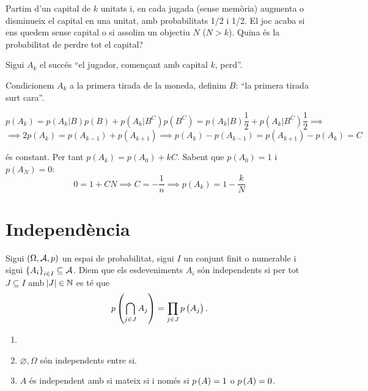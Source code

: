 \begin{problema}
    Partim d'un capital de $k$ unitats i, en cada jugada (sense memòria) augmenta o disminueix el capital en una unitat,
    amb probabilitats 1/2 i 1/2. El joc acaba si ens quedem sense capital o si assolim un objectiu $N$ ($N>k$).
    Quina és la probabilitat de perdre tot el capital?
\end{problema}
\begin{sol}
    
    Sigui $A_k$ el succés ``el jugador, començant amb capital $k$, perd''.
    
    Condicionem $A_k$ a la primera tirada de la moneda, definim $B$: ``la primera tirada surt cara''.
    
    \[p(A_k) = p(A_k|B)p(B) + p(A_k|B^C)p(B^C) = p(A_k|B)\frac{1}{2} + p(A_k|B^C)\frac{1}{2} \implies\]
    \[\implies 2p(A_k)=p(A_{k-1}) + p(A_{k+1}) \implies p(A_k) - p(A_{k-1}) = p(A_{k+1}) - p(A_k) = C\]
    
    és constant. Per tant $p(A_k) = p(A_0)+kC$. Sabent que $p(A_0)=1$ i $p(A_N)=0$:
    \[0 = 1 + CN \implies C = -\frac{1}{n} \implies p(A_k) = 1 - \frac{k}{N}\]
\end{sol}

\section{Independència}
\begin{defi}
    Sigui $\left( \Omega, \mathcal{A}, p\right)$ un espai de probabilitat, sigui $I$ un conjunt finit o numerable i sigui $\left\{ A_i\right\}_{i\in I} \subseteq \mathcal{A}$. Diem que els esdeveniments $A_i$ són independents si per tot $J\subseteq I$ amb $\abs{J}\in\mathbb{N}$ es té que
    \[
        p\left(\bigcap_{j\in J} A_j\right) = \prod_{j\in J} p\left( A_j\right).
    \]
\end{defi}

\begin{example}
    \begin{enumerate}[1.]
        \item[]
        \item $\varnothing, \Omega$ són independents entre si.
        \item $A$ és independent amb si mateix si i només si $p\left( A\right)=1$ o $p\left( A\right) =0$.
    \end{enumerate}
\end{example}





